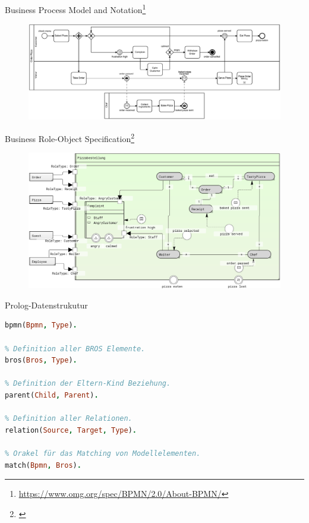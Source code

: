 \begin{frame}{Business Process Model and Notation\footnote{\url{https://www.omg.org/spec/BPMN/2.0/About-BPMN/}}}
  \vspace{8pt}
  \begin{figure}
    \centering
    \begin{adjustbox}{width=1.1\linewidth,center}
      \includegraphics{images/example/bpmn.pdf}
    \end{adjustbox}
  \end{figure}
  \vspace{18.5pt}
\end{frame}
\begin{frame}{Business Role-Object Specification\footnote{\cite{Schoen}}}
  \begin{figure}
    \centering
    \begin{adjustbox}{width=0.9\linewidth,center}
      \includegraphics{images/example/bros-rule1.png}
    \end{adjustbox}
  \end{figure}
\end{frame}

\begin{frame}[fragile]{Prolog-Datenstrukutur}
\begin{lstlisting}[language=Prolog]
% Definition aller BPMN Elemente.
bpmn(Bpmn, Type).

% Definition aller BROS Elemente.
bros(Bros, Type).

% Definition der Eltern-Kind Beziehung.
parent(Child, Parent).

% Definition aller Relationen.
relation(Source, Target, Type).

% Orakel für das Matching von Modellelementen.
match(Bpmn, Bros).
\end{lstlisting}
\end{frame}

